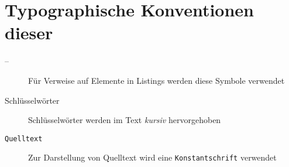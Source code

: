 \section{Typographische Konventionen dieser \thesisDesignator{}}
\label{sec:typographicConventions}

\begin{description}
    \item[ -- ] Für Verweise auf Elemente in Listings werden diese Symbole verwendet
    \item[Schlüsselwörter] Schlüsselwörter werden im Text \emph{kursiv} hervorgehoben
    \item[\texttt{Quelltext}] Zur Darstellung von Quelltext wird eine \texttt{Konstantschrift} verwendet
\end{description}